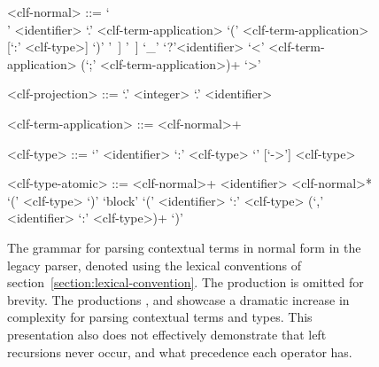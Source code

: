 \begin{figure}[H]
\begin{grammar}
<clf-normal> ::=
     `\\' <identifier> `.' <clf-term-application>
\alt `(' <clf-term-application> [`:' <clf-type>] `)'
\alt <hash-identifier> [<clf-projection>] [ `[' <clf-substitution> `]' ]
\alt <qualified-identifier> [<clf-projection>] [ `[' <clf-substitution> `]' ]
\alt `_'
\alt `?'<identifier>
\alt `<' <clf-term-application> (`;' <clf-term-application>)+ `>'

<clf-projection> ::=
     `.' <integer>
\alt `.' <identifier>

<clf-term-application> ::=
     <clf-normal>+

<clf-type> ::=
     `{' <identifier> `:' <clf-type> `}' [`->'] <clf-type>

<clf-type-atomic> ::=
     <clf-normal>+
\alt <identifier> <clf-normal>*
\alt `(' <clf-type> `)'
\alt `block' `(' <identifier> `:' <clf-type> (`,' <identifier> `:' <clf-type>)+ `)'
\end{grammar}
\caption[The grammar for parsing contextual \acs{LF} terms in normal form in the legacy parser.]{%
The grammar for parsing contextual \LF terms in normal form in the legacy parser, denoted using the lexical conventions of section~\ref{section:lexical-convention}.
The production  is omitted for brevity.
The productions ,  and  showcase a dramatic increase in complexity for parsing contextual \LF terms and types.
This presentation also does not effectively demonstrate that left recursions never occur, and what precedence each operator has.
}
\label{figure:legacy-clf-parsing}
\end{figure}

